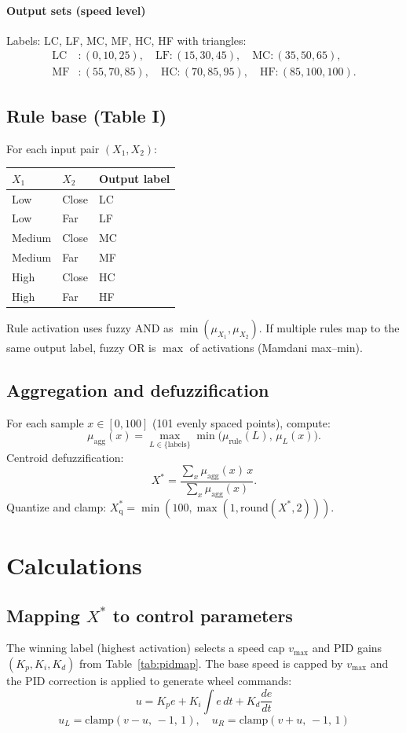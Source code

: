 \documentclass{article}
\begin{document}
\paragraph*{Output sets (speed level)}
Labels: LC, LF, MC, MF, HC, HF with triangles:
\[
\begin{aligned}
\text{LC}&:(0,10,25),\quad
\text{LF}:(15,30,45),\quad
\text{MC}:(35,50,65),\\
\text{MF}&:(55,70,85),\quad
\text{HC}:(70,85,95),\quad
\text{HF}:(85,100,100).
\end{aligned}
\]

\subsection*{Rule base (Table I)}
For each input pair $(X_1, X_2)$:
\begin{center}
\begin{tabular}{lll}
\toprule
$X_1$ & $X_2$ & Output label\\
\midrule
Low    & Close & LC\\
Low    & Far   & LF\\
Medium & Close & MC\\
Medium & Far   & MF\\
High   & Close & HC\\
High   & Far   & HF\\
\bottomrule
\end{tabular}
\end{center}
Rule activation uses fuzzy AND as $\min(\mu_{X_1},\mu_{X_2})$. If multiple rules map to the same output label, fuzzy OR is $\max$ of activations (Mamdani max--min).

\subsection*{Aggregation and defuzzification}
For each sample $x\in[0,100]$ (101 evenly spaced points), compute:
\[
\mu_{\text{agg}}(x)=\max_{L\in \{\text{labels}\}} \min\big(\mu_{\text{rule}}(L),\, \mu_{L}(x)\big).
\]
Centroid defuzzification:
\[
X^* = \frac{\sum_x \mu_{\text{agg}}(x)\, x}{\sum_x \mu_{\text{agg}}(x)}.
\]
Quantize and clamp: $X^*_{\text{q}}=\min(100,\max(1,\text{round}(X^*,2)))$.

\section{Calculations}
\subsection*{Mapping $X^*$ to control parameters}
The winning label (highest activation) selects a speed cap $v_{\max}$ and PID gains $(K_p,K_i,K_d)$ from Table~\ref{tab:pidmap}. The base speed is capped by $v_{\max}$ and the PID correction is applied to generate wheel commands:
\[
u = K_p e + K_i \int e\,dt + K_d \frac{de}{dt}
\]
\[
u_L = \text{clamp}(v - u,\,-1,\,1),\quad
u_R = \text{clamp}(v + u,\,-1,\,1)
\]
\end{document}
